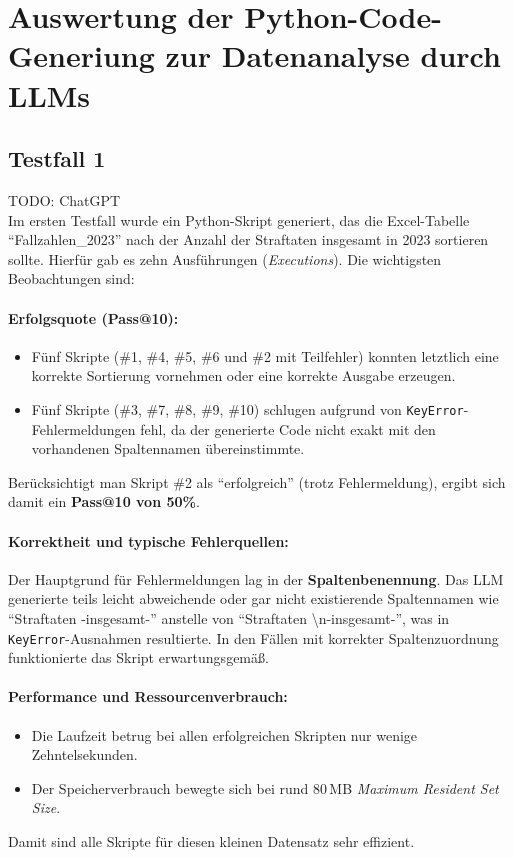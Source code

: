 \documentclass[11pt,a4paper]{article}
\begin{document}
\section{Auswertung der Python-Code-Generiung zur Datenanalyse durch LLMs}
\label{sec:auswertung}
\subsection{Testfall 1}
\label{subsec:auswertung_testfall1}
TODO: ChatGPT\\
Im ersten Testfall wurde ein Python-Skript generiert, das die Excel-Tabelle \enquote{Fallzahlen\_2023} nach der Anzahl der Straftaten insgesamt in 2023 sortieren sollte. Hierfür gab es zehn Ausführungen (\emph{Executions}). Die wichtigsten Beobachtungen sind:

\paragraph{Erfolgsquote (Pass@10):}
\begin{itemize}
    \item Fünf Skripte (\#1, \#4, \#5, \#6 und \#2 mit Teilfehler) konnten letztlich eine korrekte Sortierung vornehmen oder eine korrekte Ausgabe erzeugen.
    \item Fünf Skripte (\#3, \#7, \#8, \#9, \#10) schlugen aufgrund von \verb|KeyError|-Fehlermeldungen fehl, da der generierte Code nicht exakt mit den vorhandenen Spaltennamen übereinstimmte.
\end{itemize}
Berücksichtigt man Skript \#2 als \enquote{erfolgreich} (trotz Fehlermeldung), ergibt sich damit ein \textbf{Pass@10 von 50\%}.

\paragraph{Korrektheit und typische Fehlerquellen:}
Der Hauptgrund für Fehlermeldungen lag in der \textbf{Spaltenbenennung}. Das LLM generierte teils leicht abweichende oder gar nicht existierende Spaltennamen wie \enquote{Straftaten -insgesamt-} anstelle von \enquote{Straftaten \textbackslash n-insgesamt-}, was in \verb|KeyError|-Ausnahmen resultierte. In den Fällen mit korrekter Spaltenzuordnung funktionierte das Skript erwartungsgemäß.

\paragraph{Performance und Ressourcenverbrauch:}
\begin{itemize}
    \item Die Laufzeit betrug bei allen erfolgreichen Skripten nur wenige Zehntelsekunden.
    \item Der Speicherverbrauch bewegte sich bei rund 80\,MB \emph{Maximum Resident Set Size}.
\end{itemize}
Damit sind alle Skripte für diesen kleinen Datensatz sehr effizient.
\end{document}
